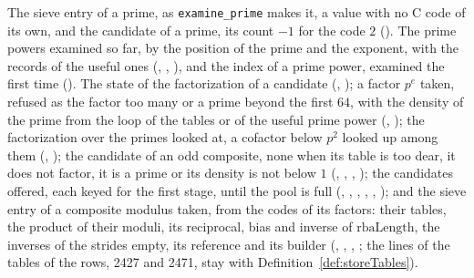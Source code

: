 \begin{definition}\label{def:compositeModuli}
  \leanok
  The sieve entry of a prime, as \verb|examine_prime| makes it, a value with no C code of its own,
  and the candidate of a prime, its count $-1$ for the code $2$
  (). The prime powers examined so far, by the position of the
  prime and the exponent, with the records of the useful ones (,
  , ), and the index of a
  prime power, examined the first time (). The state of the
  factorization of a candidate (,
  ); a factor $p^e$ taken, refused as the factor too many or a
  prime beyond the first $64$, with the density of the prime from the loop of the tables or of the
  useful prime power (, ); the
  factorization over the primes looked at, a cofactor below $p^2$ looked up among them
  (, ); the candidate of an
  odd composite, none when its table is too dear, it does not factor, it is a prime or its density
  is not below $1$ (, ,
  , ); the candidates offered,
  each keyed for the first stage, until the pool is full (,
  , ,
  , ,
  ); and the sieve entry of a composite modulus taken, from the
  codes of its factors: their tables, the product of their moduli, its reciprocal, bias and inverse
  of $\mathrm{rbaLength}$, the inverses of the strides empty, its reference and its builder
  (, ,
  , ; the lines of the tables
  of the rows, 2427 and 2471, stay with Definition~\ref{def:storeTables}).
\end{definition}

